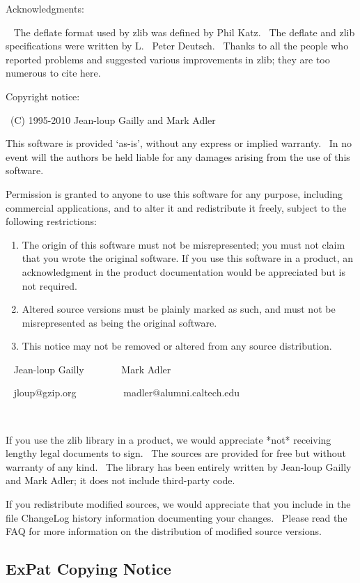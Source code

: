 Acknowledgments:

~ The deflate format used by zlib was defined by Phil Katz.~ The deflate and zlib specifications were written by L.~ Peter Deutsch.~ Thanks to all the people who reported problems and suggested various improvements in zlib; they are too numerous to cite here.

Copyright notice:

~(C) 1995-2010 Jean-loup Gailly and Mark Adler

This software is provided `as-is', without any express or implied warranty.~ In no event will the authors be held liable for any damages arising from the use of this software.

Permission is granted to anyone to use this software for any purpose, including commercial applications, and to alter it and redistribute it freely, subject to the following restrictions:

\begin{enumerate}
\def\labelenumi{\arabic{enumi}.}
\item
  The origin of this software must not be misrepresented; you must not claim that you wrote the original software. If you use this software in a product, an acknowledgment in the product documentation would be appreciated but is not required.
\item
  Altered source versions must be plainly marked as such, and must not be misrepresented as being the original software.
\item
  This notice may not be removed or altered from any source distribution.
\end{enumerate}

~ Jean-loup Gailly~~~~~~~ Mark Adler

~ jloup@gzip.org~~~~~~~~~ madler@alumni.caltech.edu

~

If you use the zlib library in a product, we would appreciate *not* receiving lengthy legal documents to sign.~ The sources are provided for free but without warranty of any kind.~ The library has been entirely written by Jean-loup Gailly and Mark Adler; it does not include third-party code.

If you redistribute modified sources, we would appreciate that you include in the file ChangeLog history information documenting your changes.~ Please read the FAQ for more information on the distribution of modified source versions.

\subsection{ExPat Copying Notice}\label{expat-copying-notice}


